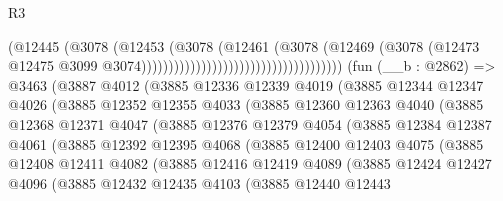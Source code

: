 \begin{lexlean}{R3}
\begin{coremodule}
                                                            (@12445
                                                              (@3078
                                                                (@12453
                                                                  (@3078
                                                                    (@12461
                                                                      (@3078
                                                                        (@12469
                                                                          (@3078
                                                                            (@12473
                                                                              @12475
                                                                              @3099
                                                                              @3074)))))))))))))))))))))))))))))))))))))
    (fun (__b : @2862) =>
    @3463
      (@3887
        @4012
        (@3885
          @12336
          @12339
          @4019
          (@3885
            @12344
            @12347
            @4026
            (@3885
              @12352
              @12355
              @4033
              (@3885
                @12360
                @12363
                @4040
                (@3885
                  @12368
                  @12371
                  @4047
                  (@3885
                    @12376
                    @12379
                    @4054
                    (@3885
                      @12384
                      @12387
                      @4061
                      (@3885
                        @12392
                        @12395
                        @4068
                        (@3885
                          @12400
                          @12403
                          @4075
                          (@3885
                            @12408
                            @12411
                            @4082
                            (@3885
                              @12416
                              @12419
                              @4089
                              (@3885
                                @12424
                                @12427
                                @4096
                                (@3885
                                  @12432
                                  @12435
                                  @4103
                                  (@3885
                                    @12440
                                    @12443

\end{coremodule}
\end{lexlean}
